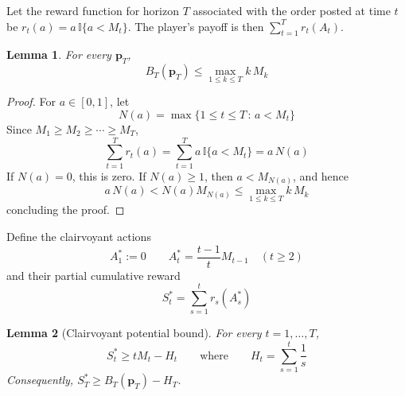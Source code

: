 \documentclass{article}
\newtheorem{lemma}{Lemma}
\newcommand{\Ind}[1]{\mathbb{I}\big\{{#1}\big\}}
\newcommand{\bp}{\boldsymbol{p}}
\begin{document}
Let the reward function for horizon $T$ associated with the order posted at time $t$ be $r_t(a) = a\,\Ind{a<M_t}$. The player's payoff is then $\sum_{t=1}^T r_t(A_t)$.
%
\begin{lemma}
\label{lem:benchmark}
For every $\bp_T$,
\begin{equation}
\label{eq:benchmark-formula}
    B_T(\bp_T) \le \max_{1\le k\le T} k\,M_k
\end{equation}
\end{lemma}
%
\begin{proof}
For $a\in[0,1]$, let
\[
    N(a) = \max\{ 1 \le t \le T \,:\, a < M_t \}
\]
Since $M_1 \ge M_2 \ge\cdots\ge M_T$,
\[
    \sum_{t=1}^T r_t(a) = \sum_{t=1}^T a\,\Ind{a < M_t} = a\,N(a)
\]
If $N(a)=0$, this is zero. If $N(a) \ge 1$, then $a < M_{N(a)}$, and hence
\[
    a\,N(a) < N(a)M_{N(a)} \le \max_{1 \le k \le T} k\,M_k
\]
concluding the proof.
\end{proof}
%
Define the clairvoyant actions
\begin{equation}\label{eq:ideal-action}
    A^*_1:=0
\qquad
    A^*_t = \frac{t-1}{t} M_{t-1} \quad (t\ge2)
\end{equation}
and their partial cumulative reward
\[
    S^*_t = \sum_{s=1}^t r_s(A^*_s)
\]
\begin{lemma}[Clairvoyant potential bound]
\label{lem:ideal-potential}
For every $t=1,\ldots,T$,
\begin{equation}\label{eq:ideal-potential}
    S^*_t \ge tM_t-H_t \qquad\text{where}\qquad H_t = \sum_{s=1}^t \frac1s
\end{equation}
Consequently, $S^*_T \ge B_T(\bp_T) - H_T$.
\end{lemma}
%
\end{document}
